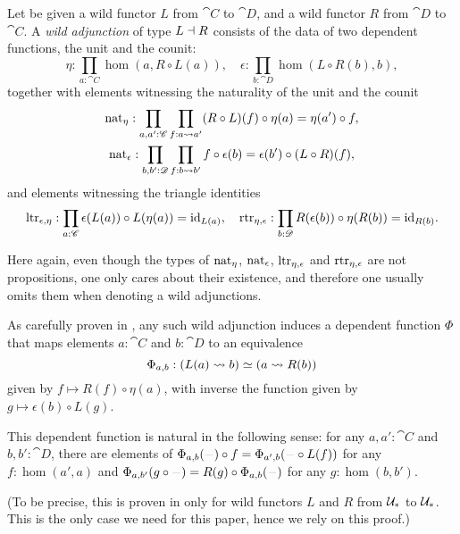 \documentclass[english,a4paper]{lmcs}
\def\githubpath{\tt\small}
\begin{document}
\begin{defi}
  Let be given a wild functor $L$ from $\cat C$ to $\cat D$, and a wild functor
  $R$ from $\cat D$ to $\cat C$. A \emph{wild adjunction} of type $L\dashv
  R$ consists of the data of two dependent functions, the unit and the counit:
  \begin{displaymath}
    \eta : \prod_{a:\cat C} \hom(a,R \circ L(a)), \quad
    \epsilon : \prod_{b:\cat D} \hom(L\circ R (b), b),
  \end{displaymath}
  together with elements witnessing the naturality of the unit and the counit
  \begin{gather*}
    \nat_\eta : \prod_{a,a':\cat C} \prod_{f:\hom(a,a')} (R\circ L)(f) \circ \eta(a) = \eta(a') \circ f, \\
    \nat_\epsilon : \prod_{b,b':\cat D} \prod_{f:\hom(b,b')} f \circ \epsilon(b) = \epsilon(b') \circ (L\circ R)(f),
  \end{gather*}
  and elements witnessing the triangle identities
  \begin{displaymath}
    \mathord{\mathrm{ltr}}_{\epsilon,\eta} : \prod_{a:\mathscr{C}} \epsilon(L(a)) \circ L(\eta(a)) = \mathord{\mathrm{id}}_{L(a)}, \quad
    \mathord{\mathrm{rtr}}_{\eta,\epsilon} : \prod_{b:\mathscr{D}} R(\epsilon(b)) \circ \eta(R(b)) = \mathord{\mathrm{id}}_{R(b)}.
  \end{displaymath}
\end{defi}
Here again, even though the types of $\mathord{\mathrm{nat}}_\eta$,
$\mathord{\mathrm{nat}}_\epsilon$, $\mathord{\mathrm{ltr}}_{\eta,\epsilon}$ and
$\mathord{\mathrm{rtr}}_{\eta,\epsilon}$ are not propositions, one only cares about their
existence, and therefore one usually omits them when denoting a wild
adjunctions.

\begin{rem} \label{def:wild-adj}
  As carefully proven in \cite[\githubpath
  theorems/homotopy/PtdAdjoint.agda]{hott-agda}, any such wild adjunction
  induces a dependent function $\Phi$ that maps elements $a:\cat C$ and $b:\cat
  D$ to an equivalence
  \begin{displaymath}
    \Phi_{a,b} : (\hom(L(a),b)) \weq (\hom(a,R(b)))
  \end{displaymath}
  given by $f \mapsto R(f) \circ \eta(a)$, with inverse the function given by
  $g\mapsto \epsilon(b) \circ L(g)$.

  This dependent function is natural in the following sense: for any $a,a':\cat
  C$ and $b,b':\cat D$, there are elements of $\Phi_{a,b}(\blank) \circ f =
  \Phi_{a',b} (\blank \circ L(f))$ for any $f:\hom(a',a)$ and
  $\Phi_{a,b'}(g\circ\blank) = R(g)\circ \Phi_{a,b} (\blank)$ for any
  $g:\hom(b,b')$.

  (To be precise, this is proven in \cite{hott-agda} only for wild functors $L$
  and $R$ from $\mathcal{U}_*$ to $\mathcal{U}_*$. This is the only case we need for this
paper, hence we rely on this proof.)
\end{rem}
\end{document}
